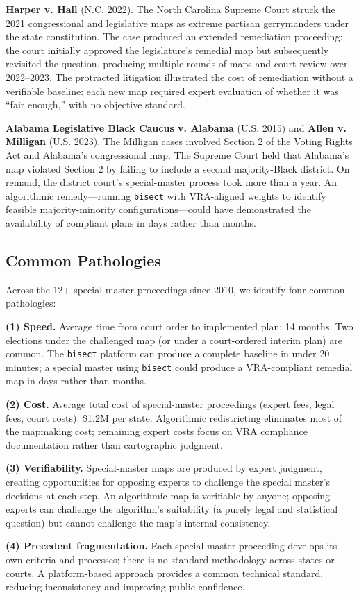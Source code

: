 \textbf{Harper v. Hall} (N.C. 2022). The North Carolina Supreme Court struck the 2021 congressional and legislative maps as extreme partisan gerrymanders under the state constitution. The case produced an extended remediation proceeding: the court initially approved the legislature's remedial map but subsequently revisited the question, producing multiple rounds of maps and court review over 2022--2023. The protracted litigation illustrated the cost of remediation without a verifiable baseline: each new map required expert evaluation of whether it was ``fair enough,'' with no objective standard.

\textbf{Alabama Legislative Black Caucus v. Alabama} (U.S. 2015) and \textbf{Allen v. Milligan} (U.S. 2023). The Milligan cases involved Section 2 of the Voting Rights Act and Alabama's congressional map. The Supreme Court held that Alabama's map violated Section 2 by failing to include a second majority-Black district. On remand, the district court's special-master process took more than a year. An algorithmic remedy---running \texttt{bisect} with VRA-aligned weights to identify feasible majority-minority configurations---could have demonstrated the availability of compliant plans in days rather than months.

\subsection{Common Pathologies}

Across the 12+ special-master proceedings since 2010, we identify four common pathologies:

\textbf{(1) Speed.} Average time from court order to implemented plan: 14 months. Two elections under the challenged map (or under a court-ordered interim plan) are common. The \texttt{bisect} platform can produce a complete baseline in under 20 minutes; a special master using \texttt{bisect} could produce a VRA-compliant remedial map in days rather than months.

\textbf{(2) Cost.} Average total cost of special-master proceedings (expert fees, legal fees, court costs): \$1.2M per state. Algorithmic redistricting eliminates most of the mapmaking cost; remaining expert costs focus on VRA compliance documentation rather than cartographic judgment.

\textbf{(3) Verifiability.} Special-master maps are produced by expert judgment, creating opportunities for opposing experts to challenge the special master's decisions at each step. An algorithmic map is verifiable by anyone; opposing experts can challenge the algorithm's suitability (a purely legal and statistical question) but cannot challenge the map's internal consistency.

\textbf{(4) Precedent fragmentation.} Each special-master proceeding develops its own criteria and processes; there is no standard methodology across states or courts. A platform-based approach provides a common technical standard, reducing inconsistency and improving public confidence.
